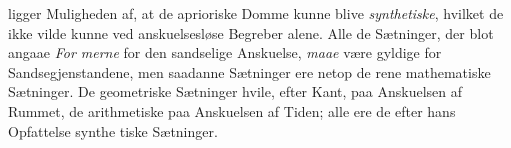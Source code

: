 \documentclass[12pt,a4paper]{book}
\begin{document}
ligger Muligheden af, at de aprioriske Domme kunne blive
\emph{synthetiske}, hvilket de ikke vilde kunne ved anskuelsesløse
Begreber alene. Alle de Sætninger, der blot angaae \emph{For\-%
merne} for den sandselige Anskuelse, \emph{maae} være gyldige for
Sandsegjenstandene, men saadanne Sætninger ere netop de
rene mathematiske Sætninger. De geometriske Sætninger hvile,
efter Kant, paa Anskuelsen af Rummet, de arithmetiske paa
Anskuelsen af Tiden; alle ere de efter hans Opfattelse synthe\-%
tiske Sætninger.
\end{document}

